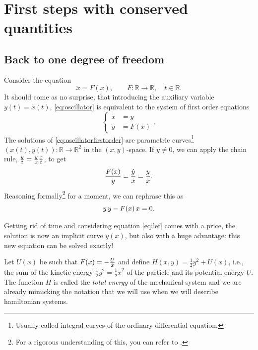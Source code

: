 \documentclass[english,fontsize=11pt,paper=a5,oneside]{scrbook}
\newcommand{\R}{\mathbb{R}}
\let\d\relax
\newcommand{\d}{\mathrm{d}}
\theoremstyle{definition}
\begin{document}
\section{First steps with conserved quantities}
\subsection{Back to one degree of freedom}\label{sec:bdf}

Consider the equation
\begin{equation}\label{eq:oscillator}
  \ddot x = F(x), \qquad F:\R\to\R, \quad t\in \R.
\end{equation}
It should come as no surprise, that introducing the auxiliary variable $y(t) = \dot x(t)$, \eqref{eq:oscillator} is equivalent to the system of first order equations
\begin{equation}\label{eq:oscillatorfirstorder}
  \left\lbrace
  \begin{aligned}
    \dot x & = y    \\
    \dot y & = F(x)
  \end{aligned}
  \right..
\end{equation}
The solutions of \eqref{eq:oscillatorfirstorder} are parametric curves\footnote{Usually called integral curves of the ordinary differential equation.} $(x(t),y(t)):\R\to\R^2$ in the $(x,y)$-space.
%
If $y\neq0$, we can apply the chain rule, $\frac{\d y}{\d t} = \frac{\d y}{\d x} \frac{\d x}{\d t}$, to get
\begin{equation}\label{eq:lef}
  \frac{F(x)}y = \frac{\dot y}{\dot x} = \frac{\d y}{\d x}.
\end{equation}
Reasoning formally\footnote{For a rigorous understanding of this, you can refer to \cite[Equation (5.1) with $f=y$ and Remark 5.1.3]{lectures:aom:seri}.} for a moment, we can rephrase this as
\begin{equation}
  y\,\d y - F(x)\, \d x = 0.
\end{equation}

Getting rid of time and considering equation \eqref{eq:lef} comes with a price, the solution is now an implicit curve $y(x)$, but also with a huge advantage: this new equation can be solved exactly!

Let $U(x)$ be such that $F(x) = -\frac{\d U}{\d x}$ and define $H(x, y) = \frac12 y^2 + U(x)$, i.e., the sum of the kinetic energy $\frac12 y^2 = \frac12 {\dot x}^2$ of the particle and its potential energy $U$.
The function $H$ is called the \emph{total energy} of the mechanical system and we are already mimicking the notation that we will use when we will describe hamiltonian systems.
\end{document}

